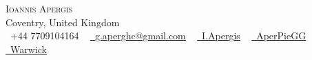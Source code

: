 \documentclass[10pt]{article}
\newcommand{\xfilll}[2][1ex]{
\dimen0=#2\advance\dimen0 by #1
\leaders\hrule height \dimen0 depth -#1\hfill}
\begin{document}
\begin{table}
    \begin{center}
    {\Huge \scshape Ioannis Apergis} \\ \vspace{1pt}
    Coventry, United Kingdom\\ \vspace{3pt}
    \small \raisebox{-0.1\height}\faPhone\ +44 7709104164 ~ \href{mailto:yourmail@gmail.com}{\raisebox{-0.2\height}\faEnvelope\  \underline{g.aperghc@gmail.com}} ~ 
    \href{https://www.linkedin.com/in/iapergis2401/}{\raisebox{-0.2\height}\faLinkedin\ \underline{I.Apergis}}  ~
    \href{https://github.com/AperpieGG}{\raisebox{-0.2\height}\faGithub\ \underline{AperPieGG}} ~   \href{https://warwick.ac.uk/fac/sci/physics/research/astro/people/ioannisapergis/}{\raisebox{-0.2\height}\faGlobe\ \underline{Warwick}}       
    \vspace{-8pt}
\end{center}
\end{table}    

\setlength{\tabcolsep}{15pt} %



\end{document}
